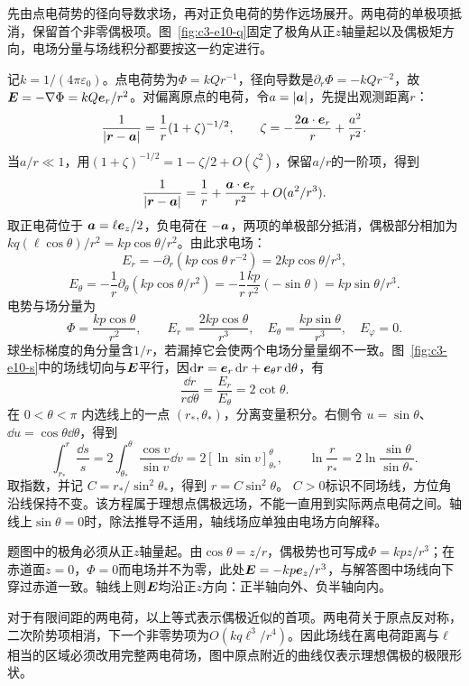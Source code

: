 \begin{solution}
先由点电荷势的径向导数求场，再对正负电荷的势作远场展开。两电荷的单极项抵消，保留首个非零偶极项。图~\ref{fig:c3-e10-q}固定了极角从正$z$轴量起以及偶极矩方向，电场分量与场线积分都要按这一约定进行。


记$k=1/(4\pi\varepsilon_0)$。点电荷势为$\Phi=kQr^{-1}$，径向导数是$\partial_r\Phi=-kQr^{-2}$，故$\bm{E}=-\nabla\Phi=kQ\bm{e}_r/r^2$。对偏离原点的电荷，令$a=|\bm{a}|$，先提出观测距离$r$：
\[
 \frac1{|\bm{r}-\bm{a}|}=\frac1r(1+\zeta)^{-1/2},
 \qquad \zeta=-\frac{2\bm{a}\cdot\bm{e}_r}{r}+\frac{a^2}{r^2}.
\]
当$a/r\ll1$，用$(1+\zeta)^{-1/2}=1-\zeta/2+O(\zeta^2)$，保留$a/r$的一阶项，得到
\[\frac1{|\bm{r}-\bm{a}|}=\frac1r+\frac{\bm{a}\cdot\bm{e}_r}{r^2}+O(a^2/r^3).
\]
取正电荷位于 $\bm{a}=\ell\bm{e}_z/2$，负电荷在 $-\bm{a}$，两项的单极部分抵消，偶极部分相加为 $kq(\ell\cos\theta)/r^2=kp\cos\theta/r^2$。由此求电场：
\[
E_r=-\partial_r(kp\cos\theta\,r^{-2})=2kp\cos\theta/r^3,
\]
\[
E_\theta=-\frac1r\partial_\theta(kp\cos\theta/r^2)
=-\frac1r\frac{kp}{r^2}(-\sin\theta)=kp\sin\theta/r^3.
\]
电势与场分量为
\[\boxed{\Phi=\frac{kp\cos\theta}{r^2}},\qquad
\boxed{E_r=\frac{2kp\cos\theta}{r^3},\quad E_\theta=\frac{kp\sin\theta}{r^3},\quad E_\varphi=0}.
\]
球坐标梯度的角分量含$1/r$，若漏掉它会使两个电场分量量纲不一致。图~\ref{fig:c3-e10-s}中的场线切向与$\bm{E}$平行，因$\mathop{}\!\mathrm d\bm{r}=\bm{e}_r\mathop{}\!\mathrm d r+\bm{e}_\theta r\mathop{}\!\mathrm d\theta$，有
\[\frac{\dd r}{r\dd\theta}=\frac{E_r}{E_\theta}=2\cot\theta.
\]
在 $0<\theta<\pi$ 内选线上的一点 $(r_*,\theta_*)$，分离变量积分。右侧令 $u=\sin\theta$、$\dd u=\cos\theta\dd\theta$，得到
\[
\int_{r_*}^r\frac{\dd s}s=2\int_{\theta_*}^\theta\frac{\cos v}{\sin v}\dd v
=2[\ln\sin v]_{\theta_*}^\theta,
\qquad \ln\frac r{r_*}=2\ln\frac{\sin\theta}{\sin\theta_*}.
\]
取指数，并记 $C=r_*/\sin^2\theta_*$，得到 $\boxed{r=C\sin^2\theta}$。
$C>0$标识不同场线，方位角沿线保持不变。该方程属于理想点偶极远场，不能一直用到实际两点电荷之间。轴线上$\sin\theta=0$时，除法推导不适用，轴线场应单独由电场方向解释。


题图中的极角必须从正$z$轴量起。由$\cos\theta=z/r$，偶极势也可写成$\Phi=kpz/r^3$；在赤道面$z=0$，$\Phi=0$而电场并不为零，此处$\bm{E}=-kp\bm{e}_z/r^3$，与解答图中场线向下穿过赤道一致。轴线上则$\bm{E}$均沿正$z$方向：正半轴向外、负半轴向内。

对于有限间距的两电荷，以上等式表示偶极近似的首项。两电荷关于原点反对称，二次阶势项相消，下一个非零势项为$O(kq\ell^3/r^4)$。因此场线在离电荷距离与$\ell$相当的区域必须改用完整两电荷场，图中原点附近的曲线仅表示理想偶极的极限形状。


\end{solution}
